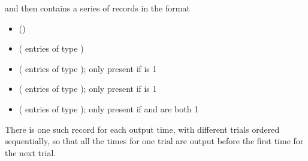 \documentclass[letterpaper,10pt,english]{sphinxmanual}
\begin{document}
and then contains a series of records in the format
\begin{itemize}
\item {} 
 ()

\item {} 
 ( entries of type )

\item {} 
 ( entries of type ); only present if  is 1

\item {} 
 ( entries of type ); only present if  is 1

\item {} 
 ( entries of type ); only present if  and  are both 1

\end{itemize}

There is one such record for each output time, with different trials ordered sequentially, so that all the times for one trial are output before the first time for the next trial.
\end{document}
